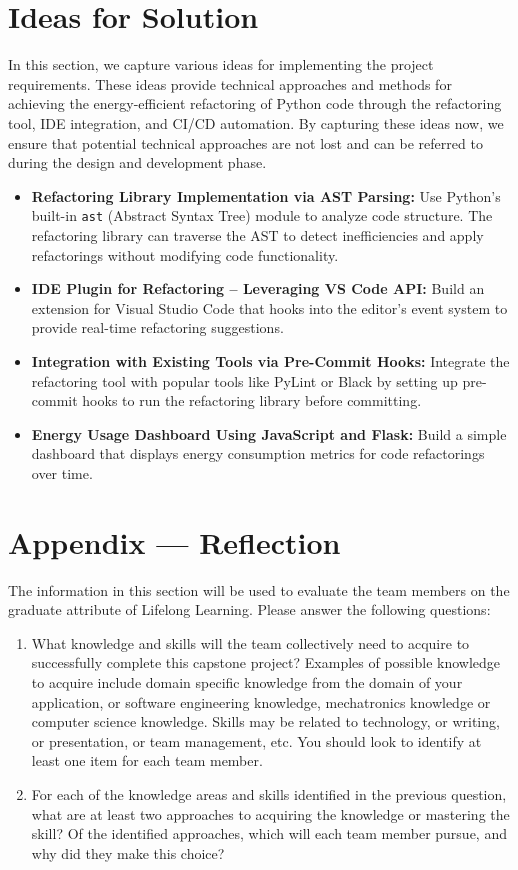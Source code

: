 \documentclass[12pt]{article}
\begin{document}
\section{Ideas for Solution}
In this section, we capture various ideas for implementing the project requirements. These ideas provide technical approaches and methods for achieving the energy-efficient refactoring of Python code through the refactoring tool, IDE integration, and CI/CD automation. By capturing these ideas now, we ensure that potential technical approaches are not lost and can be referred to during the design and development phase.
\begin{itemize}
    \item \textbf{Refactoring Library Implementation via AST Parsing:} 
    Use Python’s built-in \texttt{ast} (Abstract Syntax Tree) module to analyze code structure. The refactoring library can traverse the AST to detect inefficiencies and apply refactorings without modifying code functionality.
    \item \textbf{IDE Plugin for Refactoring – Leveraging VS Code API:} 
    Build an extension for Visual Studio Code that hooks into the editor’s event system to provide real-time refactoring suggestions.
    \item \textbf{Integration with Existing Tools via Pre-Commit Hooks:} 
    Integrate the refactoring tool with popular tools like PyLint or Black by setting up pre-commit hooks to run the refactoring library before committing.
    \item \textbf{Energy Usage Dashboard Using JavaScript and Flask:} 
    Build a simple dashboard that displays energy consumption metrics for code refactorings over time.
\end{itemize}



\newpage{}
\section*{Appendix --- Reflection}

The information in this section will be used to evaluate the team members on the
graduate attribute of Lifelong Learning.  Please answer the following questions:

\begin{enumerate}
  \item What knowledge and skills will the team collectively need to acquire to
  successfully complete this capstone project?  Examples of possible knowledge
  to acquire include domain specific knowledge from the domain of your
  application, or software engineering knowledge, mechatronics knowledge or
  computer science knowledge.  Skills may be related to technology, or writing,
  or presentation, or team management, etc.  You should look to identify at
  least one item for each team member.
  \item For each of the knowledge areas and skills identified in the previous
  question, what are at least two approaches to acquiring the knowledge or
  mastering the skill?  Of the identified approaches, which will each team
  member pursue, and why did they make this choice?
\end{enumerate}
\end{document}

